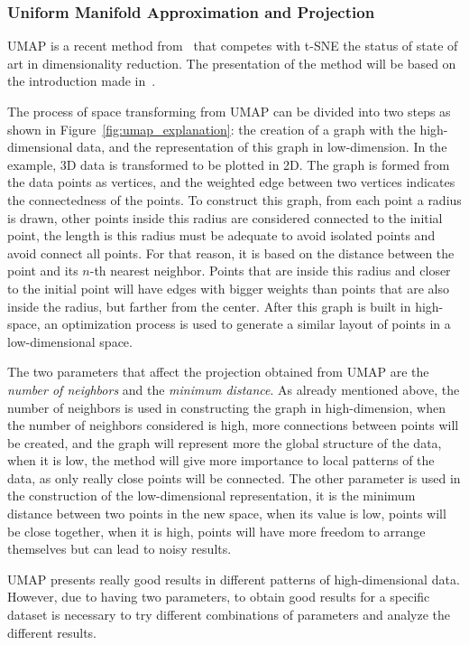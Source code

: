 \subsubsection{Uniform Manifold Approximation and Projection}
%
UMAP is a recent method from~\cite{mcinnes2020umap} that competes with t-SNE the status of state of art in dimensionality reduction.
%
The presentation of the method will be based on the introduction made in~\cite{coenen2018umap}.
%

The process of space transforming from UMAP can be divided into two steps as shown in Figure~\ref{fig:umap_explanation}: the creation of a graph with the high-dimensional data, and the representation of this graph in low-dimension. 
%
In the example, 3D data is transformed to be plotted in 2D.
%
The graph is formed from the data points as vertices, and the weighted edge between two vertices indicates the connectedness of the points.
%
To construct this graph, from each point a radius is drawn, 
%
other points inside this radius are considered connected to the initial point,
%
the length is this radius must be adequate to avoid isolated points and avoid connect all points.
%
For that reason, it is based on the distance between the point and its $n$-th nearest neighbor.
%
Points that are inside this radius and closer to the initial point will have edges with bigger weights than points that are also inside the radius, but farther from the center.
%
After this graph is built in high-space, an optimization process is used to generate a similar layout of points in a low-dimensional space.
%

The two parameters that affect the projection obtained from UMAP are the \textit{number of neighbors} and the \textit{minimum distance}.
%
As already mentioned above, the number of neighbors is used in constructing the graph in high-dimension, 
%
when the number of neighbors considered is high, more connections between points will be created, and the graph will represent more the global structure of the data,
%
when it is low, the method will give more importance to local patterns of the data, as only really close points will be connected.
%
The other parameter is used in the construction of the low-dimensional representation, it is the minimum distance between two points in the new space,
%
when its value is low, points will be close together,
%
when it is high, points will have more freedom to arrange themselves but can lead to noisy results.
%

UMAP presents really good results in different patterns of high-dimensional data.
%
However, due to having two parameters,
%
to obtain good results for a specific dataset is necessary to try different combinations of parameters and analyze the different results.
%

